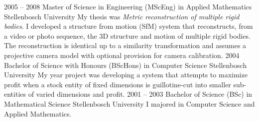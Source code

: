 \documentclass[9pt]{developercv} %
\begin{document}
\begin{entrylist}
	\entry
		{2005 -- 2008}
		{Master of Science in Engineering (MScEng) in Applied Mathematics}
		{Stellenbosch University}
		{My thesis was \textit{Metric reconstruction of multiple rigid bodies}. I developed a structure from motion (SfM) system that reconstructs, from a video or photo sequence, the 3D structure and motion of multiple rigid bodies. The reconstruction is identical up to a similarity transformation and assumes a projective camera model with optional provision for camera calibration.}
	\entry
		{2004}
		{Bachelor of Science with Honours (BScHons) in Computer Science}
		{Stellenbosch University}
		{My year project was developing a system that attempts to maximize profit when a stock entity of fixed dimensions is guillotine-cut into smaller sub-entities of varied dimensions and profit.}
	\entry
		{2001 -- 2003}
		{Bachelor of Science (BSc) in Mathematical Science}
		{Stellenbosch University}
		{I majored in Computer Science and Applied Mathematics.}
\end{entrylist}

\end{document}
